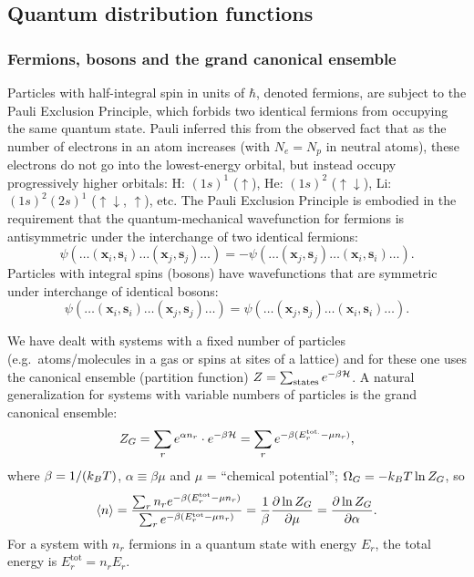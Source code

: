 \subsection{Quantum distribution functions}
\subsubsection*{Fermions, bosons and the grand canonical ensemble}

Particles with half-integral spin in units of $\hbar$, denoted fermions, are subject to the Pauli Exclusion Principle,
which forbids two identical fermions from occupying the same quantum state. Pauli inferred this from the observed fact that
as the number of electrons in an atom increases (with $N_e = N_p$ in neutral atoms), these electrons do not go into the
lowest-energy orbital, but instead occupy progressively higher orbitals: H: $(1s)^1$ ($\uparrow$), He: $(1s)^2$
($\uparrow\downarrow$), Li: $(1s)^2(2s)^1$ ($\uparrow\downarrow$, $\uparrow$), etc. The Pauli Exclusion Principle is
embodied in the requirement that the quantum-mechanical wavefunction for fermions is antisymmetric under the interchange of
two identical fermions:
\begin{equation}
  \psi(\ldots(\mathbf x_i,\mathbf s_i)\ldots(\mathbf x_j,\mathbf s_j)\ldots) = -\psi(\ldots(\mathbf x_j,\mathbf s_j)\ldots(\mathbf x_i,\mathbf s_i)\ldots).
\end{equation}
Particles with integral spins (bosons) have wavefunctions that are symmetric under interchange of identical bosons:
\begin{equation}
  \psi(\ldots(\mathbf x_i,\mathbf s_i)\ldots(\mathbf x_j,\mathbf s_j)\ldots) = \psi(\ldots(\mathbf x_j,\mathbf s_j)\ldots(\mathbf x_i,\mathbf s_i)\ldots).
\end{equation}

We have dealt with systems with a fixed number of particles (e.g.\ atoms/molecules in a gas or spins at sites of a lattice)
and for these one uses the canonical ensemble (partition function) $Z = \sum_{\text{states}}e^{-\beta\mathcal{H}}$. A natural
generalization for systems with variable numbers of particles is the grand canonical ensemble:
\begin{equation}
  Z_G = \sum_re^{\alpha n_r}\cdot e^{-\beta\mathcal{H}} = \sum_re^{-\beta(E_r^{\text{tot.}}-\mu n_r)},
\end{equation}
where $\beta = 1/(k_{B} T)$, $\alpha\equiv\beta\mu$ and $\mu$ = ``chemical potential''; $\Omega_G = -k_{B} T\ln Z_G$, so
\begin{equation}
  \langle n\rangle = \frac{\sum_rn_re^{-\beta(E_r^{\text{tot}}-\mu n_r)}}{\sum_re^{-\beta(E_r^{\text{tot}}-\mu n_r)}}
        = \frac{1}{\beta}\frac{\partial\ln Z_G}{\partial\mu} = \frac{\partial\ln Z_G}{\partial\alpha}.
\end{equation}
For a system with $n_r$ fermions in a quantum state with energy $E_r$, the total energy is $E_r^{\text{tot}} = n_rE_r$.

